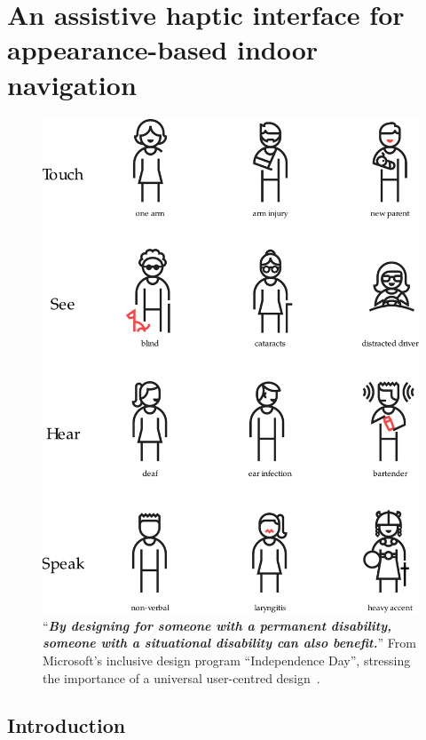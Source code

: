 \chapter{An assistive haptic interface for appearance-based indoor navigation}\label{ch:chapter6}


\begin{figure}[h]
\centering
\includegraphics[scale=0.5]{gfx/Chapter06/inclusive_design.pdf}
\caption{``\textit{\textbf{By designing for someone with a permanent disability, someone with a situational disability can also benefit.}}'' From Microsoft's inclusive design program ``Independence Day'', stressing the importance of a universal user-centred design~\cite{msinclusivedesign}.}
\label{fig:microsoft_inclusive_design}
\end{figure}

\section{Introduction}
\label{sec:Intro}

